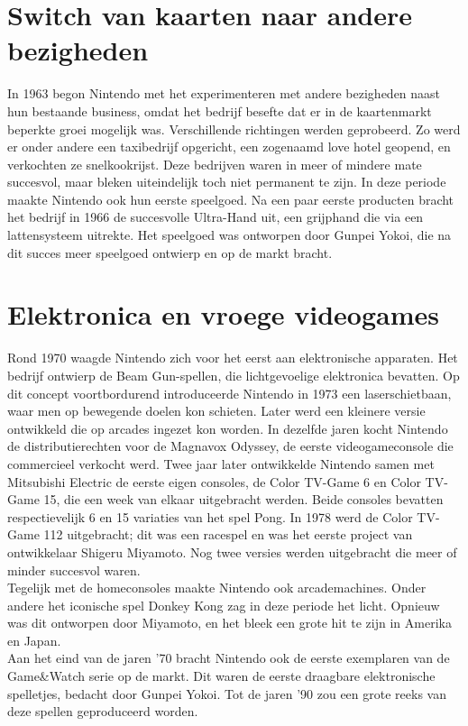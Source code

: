 \documentclass{article}
\begin{document}
\section{Switch van kaarten naar andere bezigheden}
In 1963 begon Nintendo met het experimenteren met andere bezigheden naast hun bestaande business, omdat het bedrijf besefte dat er in de kaartenmarkt beperkte groei mogelijk was. Verschillende richtingen werden geprobeerd. Zo werd er onder andere een taxibedrijf opgericht, een zogenaamd love hotel geopend, en verkochten ze snelkookrijst. Deze bedrijven waren in meer of mindere mate succesvol, maar bleken uiteindelijk toch niet permanent te zijn. 
In deze periode maakte Nintendo ook hun eerste speelgoed. Na een paar eerste producten bracht het bedrijf in 1966 de succesvolle Ultra-Hand uit, een grijphand die via een lattensysteem uitrekte. Het speelgoed was ontworpen door Gunpei Yokoi, die na dit succes meer speelgoed ontwierp en op de markt bracht.


\section{Elektronica en vroege videogames}
Rond 1970 waagde Nintendo zich voor het eerst aan elektronische apparaten. Het bedrijf ontwierp de Beam Gun-spellen, die lichtgevoelige elektronica bevatten. Op dit concept voortbordurend introduceerde Nintendo in 1973 een laserschietbaan, waar men op bewegende doelen kon schieten. Later werd een kleinere versie ontwikkeld die op arcades ingezet kon worden.
In dezelfde jaren kocht Nintendo de distributierechten voor de Magnavox Odyssey, de eerste videogameconsole die commercieel verkocht werd. Twee jaar later ontwikkelde Nintendo samen met Mitsubishi Electric de eerste eigen consoles, de Color TV-Game 6 en Color TV-Game 15, die een week van elkaar uitgebracht werden. Beide consoles bevatten respectievelijk 6 en 15 variaties van het spel Pong. In 1978 werd de Color TV-Game 112 uitgebracht; dit was een racespel en was het eerste project van ontwikkelaar Shigeru Miyamoto. Nog twee versies werden uitgebracht die meer of minder succesvol waren. 
\\ 
Tegelijk met de homeconsoles maakte Nintendo ook arcademachines. Onder andere het iconische spel Donkey Kong zag in deze periode het licht. Opnieuw was dit ontworpen door Miyamoto, en het bleek een grote hit te zijn in Amerika en Japan.
\\ 
Aan het eind van de jaren '70 bracht Nintendo ook de eerste exemplaren van de Game\&Watch serie op de markt. Dit waren de eerste draagbare elektronische spelletjes, bedacht door Gunpei Yokoi. Tot de jaren '90 zou een grote reeks van deze spellen geproduceerd worden.
\end{document}

